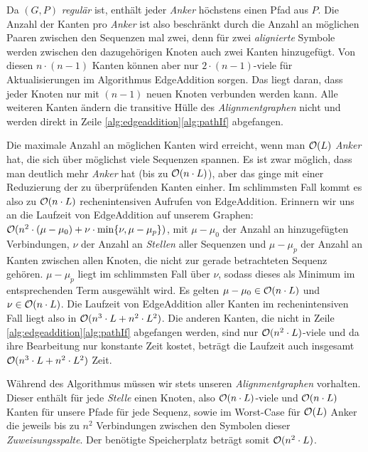 \begin{beweis}
	Da $(G,P)$ \emph{regulär} ist, enthält jeder \emph{Anker} höchstens einen Pfad aus $P$. Die Anzahl der Kanten pro \emph{Anker} ist also beschränkt durch die Anzahl an möglichen Paaren zwischen den Sequenzen mal zwei, denn für zwei \emph{alignierte} Symbole werden zwischen den dazugehörigen Knoten auch zwei Kanten hinzugefügt. Von diesen $n\cdot (n-1)$ Kanten können aber nur $2\cdot (n-1)$-viele für Aktualisierungen im Algorithmus \textrm{EdgeAddition} sorgen. Das liegt daran, dass jeder Knoten nur mit $(n-1)$ neuen Knoten verbunden werden kann. Alle weiteren Kanten ändern die transitive Hülle des \emph{Alignmentgraphen} nicht und werden direkt in Zeile \ref{alg:edgeaddition}\ref{alg:pathIf} abgefangen.
	
	Die maximale Anzahl an möglichen Kanten wird erreicht, wenn man $\mathcal{O}(L)$ \emph{Anker} hat, die sich über möglichst viele Sequenzen spannen. Es ist zwar möglich, dass man deutlich mehr \emph{Anker} hat (bis zu $\mathcal{O}(n\cdot L)$), aber das ginge mit einer Reduzierung der zu überprüfenden Kanten einher. Im schlimmsten Fall kommt es also zu $\mathcal{O}(n\cdot L)$ rechenintensiven Aufrufen von \textrm{EdgeAddition}. Erinnern wir uns an die Laufzeit von \textrm{EdgeAddition} auf unserem Graphen: $\mathcal{O}(n^2 \cdot (\mu - \mu_0) + \nu \cdot \min\{\nu, \mu - \mu_p\})$, mit $\mu - \mu_0$ der Anzahl an hinzugefügten Verbindungen, $\nu$ der Anzahl an \emph{Stellen} aller Sequenzen und $\mu - \mu_p$ der Anzahl an Kanten zwischen allen Knoten, die nicht zur gerade betrachteten Sequenz gehören. $\mu - \mu_p$ liegt im schlimmsten Fall über $\nu$, sodass dieses als Minimum im entsprechenden Term ausgewählt wird. Es gelten $\mu - \mu_0 \in \mathcal{O}(n\cdot L)$ und $\nu \in \mathcal{O}(n\cdot L)$. Die Laufzeit von \textrm{EdgeAddition} aller Kanten im rechenintensiven Fall liegt also in $\mathcal{O}(n^3\cdot L + n^2\cdot L^2)$. Die anderen Kanten, die nicht in Zeile \ref{alg:edgeaddition}\ref{alg:pathIf} abgefangen werden, sind nur $\mathcal{O}(n^2\cdot L)$-viele und da ihre Bearbeitung nur konstante Zeit kostet, beträgt die Laufzeit auch insgesamt $\mathcal{O}(n^3\cdot L + n^2\cdot L^2)$ Zeit.
	
	Während des Algorithmus müssen wir stets unseren \emph{Alignmentgraphen} vorhalten. Dieser enthält für jede \emph{Stelle} einen Knoten, also $\mathcal{O}(n\cdot L)$-viele und $\mathcal{O}(n\cdot L)$ Kanten für unsere Pfade für jede Sequenz, sowie im Worst-Case für $\mathcal{O}(L)$ Anker die jeweils bis zu $n^2$ Verbindungen zwischen den Symbolen dieser \emph{Zuweisungsspalte}. Der benötigte Speicherplatz beträgt somit $\mathcal{O}(n^2\cdot L)$.  
\end{beweis}

